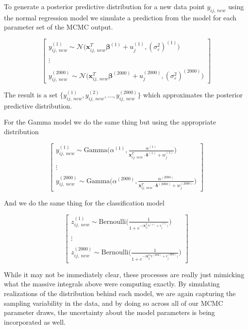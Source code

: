 \documentclass[12pt,twoside]{reedthesis}
\begin{document}
To generate a posterior predictive distribution for a new data point \(y_{ij,\ new}\) using the normal regression model we simulate a prediction from the model for each parameter set of the MCMC output.

\[
\begin{bmatrix}
y_{ij, \ new}^{(1)} \sim \mathcal{N}\Big( \mathbf{x}_{ij, \ new}^T \boldsymbol{\beta}^{(1)} + u_j^{(1)}, (\sigma_{\varepsilon}^2)^{(1)}\Big) \\
\\
\vdots \\
\\
y_{ij, \ new}^{(2000)} \sim \mathcal{N}\Big(\mathbf{x}_{ij, \ new}^T \boldsymbol{\beta}^{(2000)} + u_j^{(2000)}, (\sigma_{\varepsilon}^2)^{(2000)}\Big)
\end{bmatrix}
\]

The result is a set \(\Big\{y_{ij , \ new}^{(1)}, y_{ij, \ new}^{(2)}, ..., y_{ij, \ new}^{(2000)}\Big\}\) which approximates the posterior predictive distribution.

For the Gamma model we do the same thing but using the appropriate distribution

\[
\begin{bmatrix}
y_{ij, \ new}^{(1)} \sim \text{Gamma}\Bigg(\alpha^{(1)}, \frac{\alpha^{(1)}}{ \mathbf{x}_{ij, \ new}^T\cdot \boldsymbol{\delta}^{(1)} + w_j^{(1)}}\Bigg) \\
\\
\vdots \\
\\
y_{ij, \ new}^{(2000)} \sim \text{Gamma}\Bigg(\alpha^{(2000)}, \frac{\alpha^{(2000)}}{ \mathbf{x}_{ij, \ new}^T\cdot \boldsymbol{\delta}^{(2000)} + w_j^{(2000)}}\Bigg)
\end{bmatrix}
\]

And we do the same thing for the classification model

\[
\begin{bmatrix}
z_{ij, \ new}^{(1)} \sim \text{Bernoulli}\Bigg(\frac{1}{1 + e^{-\big(\mathbf{x}_{ij}^T\boldsymbol{\gamma}^{(1)} + v_j^{(1)}\big)}}\Bigg) \\
\\ \vdots \\ \\
z_{ij, \ new}^{(2000)} \sim \text{Bernoulli}\Bigg(\frac{1}{1 + e^{-\big(\mathbf{x}_{ij}^T\boldsymbol{\gamma}^{(2000)} + v_j^{(2000)}\big)}}\Bigg)
\end{bmatrix}
\]

While it may not be immediately clear, these processes are really just mimicking what the massive integrals above were computing exactly. By simulating realizations of the distribution behind each model, we are again capturing the sampling variability in the data, and by doing so across all of our MCMC parameter draws, the uncertainty about the model parameters is being incorporated as well.
\end{document}
